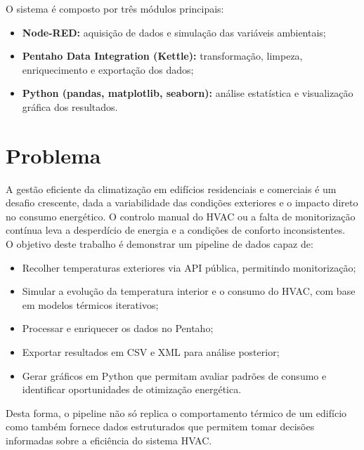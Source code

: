 \documentclass[a4paper, 12pt]{article} %
\begin{document}
O sistema é composto por três módulos principais:
\begin{itemize}
	\item \textbf{Node-RED:} aquisição de dados e simulação das variáveis ambientais;
	\item \textbf{Pentaho Data Integration (Kettle):} transformação, limpeza, enriquecimento e exportação dos dados;
	\item \textbf{Python (pandas, matplotlib, seaborn):} análise estatística e visualização gráfica dos resultados.
\end{itemize}


\newpage
\section{Problema}

A gestão eficiente da climatização em edifícios residenciais e comerciais é um desafio crescente, dada a variabilidade das condições exteriores e o impacto direto no consumo energético.  
O controlo manual do HVAC ou a falta de monitorização contínua leva a desperdício de energia e a condições de conforto inconsistentes.\\

O objetivo deste trabalho é demonstrar um pipeline de dados capaz de:
\begin{itemize}
	\item Recolher temperaturas exteriores via API pública, permitindo monitorização;
	\item Simular a evolução da temperatura interior e o consumo do HVAC, com base em modelos térmicos iterativos;
	\item Processar e enriquecer os dados no Pentaho;
	\item Exportar resultados em CSV e XML para análise posterior;
	\item Gerar gráficos em Python que permitam avaliar padrões de consumo e identificar oportunidades de otimização energética.
\end{itemize}

Desta forma, o pipeline não só replica o comportamento térmico de um edifício como também fornece dados estruturados que permitem tomar decisões informadas sobre a eficiência do sistema HVAC.

\end{document}
